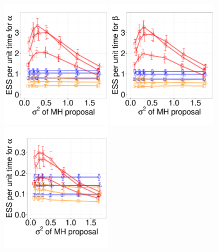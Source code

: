 
  \begin{figure}%
  \centering
  \begin{minipage}[!hp]{0.68\linewidth}
  \centering
    \includegraphics [width=0.49\textwidth, angle=0]{figs/pc_3_alpha.pdf}
    \includegraphics [width=0.49\textwidth, angle=0]{figs/pc_3_beta.pdf}
  \centering
    \includegraphics [width=0.49\textwidth, angle=0]{figs/pc_10_alpha.pdf}

\end{minipage}
\end{figure}
